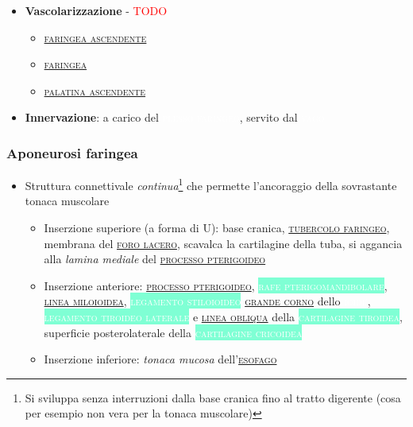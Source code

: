 \documentclass[italian,]{article}
\providecommand{\tightlist}{%
  \setlength{\itemsep}{0pt}\setlength{\parskip}{0pt}}
\newcommand{\mus}[1]{\colorbox{Salmon}{\textcolor{white}{\textsc{#1}}}}
\newcommand{\oss}[1]{\colorbox{ossa}{\textcolor{white}{\textsc{#1}}}}
\newcommand{\tol}[1]{\colorbox{Aquamarine}{\textcolor{white}{\textsc{#1}}}}
\newcommand{\ner}[1]{\colorbox{Dandelion}{\textcolor{white}{\textsc{#1}}}}
\renewcommand{\a}[1]{\underline{\textsc{#1}}}
\newcommand{\TODO}[1]{\textcolor{red}{\textsf{\footnotesize{TODO #1}}}} %
\begin{document}
\begin{itemize}
\begin{itemize}
\begin{itemize}
\begin{itemize}
        \begin{itemize}
        \tightlist
        \item
          Un fascio sull margine dorsocraniale della
          \tol{cartilagine tiroidea}
        \end{itemize}
      \item
        \textbf{Azione}: eleva, accorciandola, la faringe
      \end{itemize}
    \end{itemize}
  \item
    \mus{stilofaringeo}

    \begin{itemize}
    \item
      \TODO{}
    \end{itemize}
  \end{itemize}
\item
  \textbf{Vascolarizzazione} - \TODO{}

  \begin{itemize}
  \item
    \a{faringea ascendente}
  \item
    \a{faringea}
  \item
    \a{palatina ascendente}
  \end{itemize}
\item
  \textbf{Innervazione}: a carico del \ner{plesso faringeo}, servito dal
  \ner{vago}
\end{itemize}

\hypertarget{aponeurosi-faringea}{%
\subsubsection{Aponeurosi faringea}\label{aponeurosi-faringea}}

\begin{itemize}
\tightlist
\item
  Struttura connettivale \emph{continua}\footnote{Si sviluppa senza
    interruzioni dalla base cranica fino al tratto digerente (cosa per
    esempio non vera per la tonaca muscolare)} che permette l'ancoraggio
  della sovrastante tonaca muscolare

  \begin{itemize}
  \tightlist
  \item
    Inserzione superiore (a forma di U): base cranica,
    \a{tubercolo faringeo}, membrana del \a{foro lacero}, scavalca la
    cartilagine della tuba, si aggancia alla \emph{lamina mediale} del
    \a{processo pterigoideo}
  \item
    Inserzione anteriore: \a{processo pterigoideo},
    \tol{rafe pterigomandibolare}, \a{linea miloioidea},
    \tol{legamento stiloioideo} \a{grande corno} dello \oss{ioide},
    \tol{legamento tiroideo laterale} e \a{linea obliqua} della
    \tol{cartilagine tiroidea}, superficie posterolaterale della
    \tol{cartilagine cricoidea}
  \item
    Inserzione inferiore: \emph{tonaca mucosa} dell'\a{esofago}
  \end{itemize}
\end{itemize}
\end{document}
